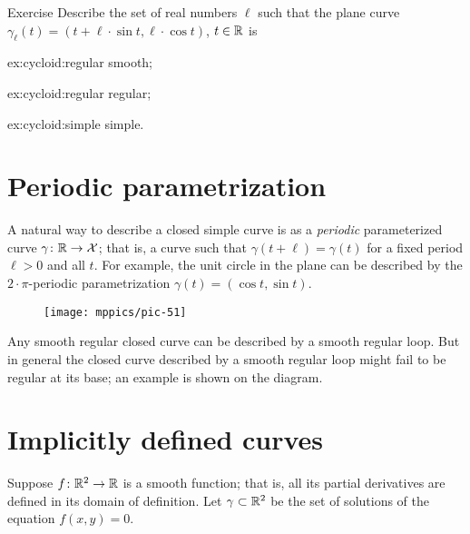 \begin{thm}{Exercise}\label{ex:cycloid}
Describe the set of real numbers $\ell $
such that the plane curve $\gamma_\ell (t)= (t+\ell \cdot \sin t,\ell \cdot \cos t)$, $t\in\mathbb{R}$ is



\begin{subthm}{ex:cycloid:regular}
smooth; %
\end{subthm}

\begin{subthm}{ex:cycloid:regular}
regular;
\end{subthm}

\begin{subthm}{ex:cycloid:simple}
simple.
\end{subthm}

\end{thm}

\section{Periodic parametrization}
A natural way to describe a closed simple curve is as a \emph{periodic} parameterized curve $\gamma\colon \mathbb{R}\to \mathcal{X}$; that is, a curve such that $\gamma(t+\ell)=\gamma(t)$ for a fixed period $\ell > 0$ and all $t$.
For example, the unit circle in the plane can be described by the $2{\cdot}\pi$-periodic parametrization $\gamma(t)=(\cos t,\sin t)$.

{

\begin{wrapfigure}{o}{17 mm}
\vskip-3mm
\centering
\texttt{[image: mppics/pic-51]}
\end{wrapfigure}

Any smooth regular closed curve can be described by a smooth regular loop.
But in general the closed curve described by a smooth regular loop might fail to be regular at its base; an example is shown on the diagram.

}

\section{Implicitly defined curves}

Suppose $f\colon\mathbb{R}^2\to \mathbb{R}$ is a smooth function; 
that is, all its partial derivatives are defined in its domain of definition.
Let $\gamma\subset \mathbb{R}^2$ be the set of solutions of the equation $f(x,y)=0$.

